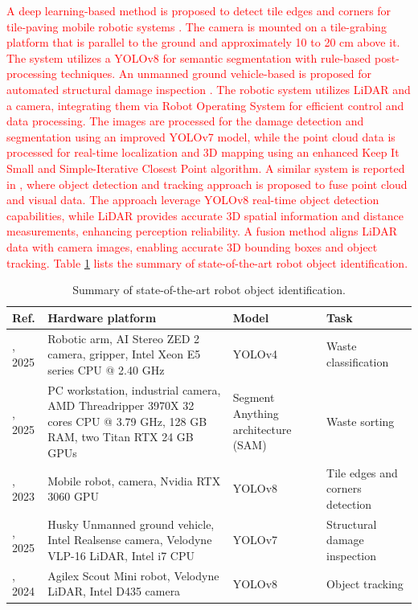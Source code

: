 \documentclass[preprint,12pt]{elsarticle}
\begin{document}
\textcolor{red}{A deep learning-based method is proposed to detect tile edges and corners for tile-paving mobile robotic systems \citep{liu_automatic_2025}. The camera is mounted on a tile-grabing platform that is parallel to the ground and approximately 10 to 20 cm above it. The system utilizes a YOLOv8 for semantic segmentation with rule-based post-processing techniques. An unmanned ground vehicle-based is proposed for automated structural damage inspection \citep{ge_deep_2025}. The robotic system utilizes LiDAR and a camera, integrating them via Robot Operating System for efficient control and data processing. The images are processed for the damage detection and segmentation using an improved YOLOv7 model, while the point cloud data is processed for real-time localization and 3D mapping using an enhanced Keep It Small and Simple-Iterative Closest Point algorithm. A similar system is reported in \citep{dai_advanced_2024}, where object detection and tracking approach is proposed to fuse point cloud and visual data. The approach leverage YOLOv8 real-time object detection capabilities, while LiDAR provides accurate 3D spatial information and distance measurements, enhancing perception reliability. A fusion method aligns LiDAR data with camera images, enabling accurate 3D bounding boxes and object tracking. Table \ref{table_summary_objidn_studies} lists the summary of state-of-the-art robot object identification.}

\begin{center}
\begin{table}
\caption{Summary of state-of-the-art robot object identification.}
\scriptsize
\begin{tabular}{|p{1cm} | p{4.5cm} | p{4.5cm} | p{3.0cm} |}
 \hline
 Ref. & Hardware platform & Model & Task \\ 
 \hline
 \citep{le_application_2025}, 2025 & Robotic arm, AI Stereo ZED 2 camera, gripper, Intel Xeon E5 series CPU @ 2.40 GHz & YOLOv4 & Waste classification \\ 
 \hline
 \citep{vukicevic_versatile_2025}, 2025 & PC workstation, industrial camera, AMD Threadripper 3970X 32 cores CPU @ 3.79 GHz, 128 GB RAM, two Titan RTX 24 GB GPUs & Segment Anything architecture (SAM) & Waste sorting \\
 \hline
\citep{kirillov_segment_2023}, 2023 & Mobile robot, camera, Nvidia RTX 3060 GPU & YOLOv8 & Tile edges and corners detection \\
 \hline
 \citep{ge_deep_2025}, 2025 & Husky Unmanned ground vehicle, Intel Realsense camera, Velodyne VLP-16 LiDAR, Intel i7 CPU & YOLOv7 & Structural damage inspection \\
 \hline
 \citep{dai_advanced_2024}, 2024 & Agilex Scout Mini robot, Velodyne LiDAR, Intel D435 camera & YOLOv8 & Object tracking \\ 
 \hline
\end{tabular}
\label{table_summary_objidn_studies}
\end{table}
\end{center}
\end{document}
